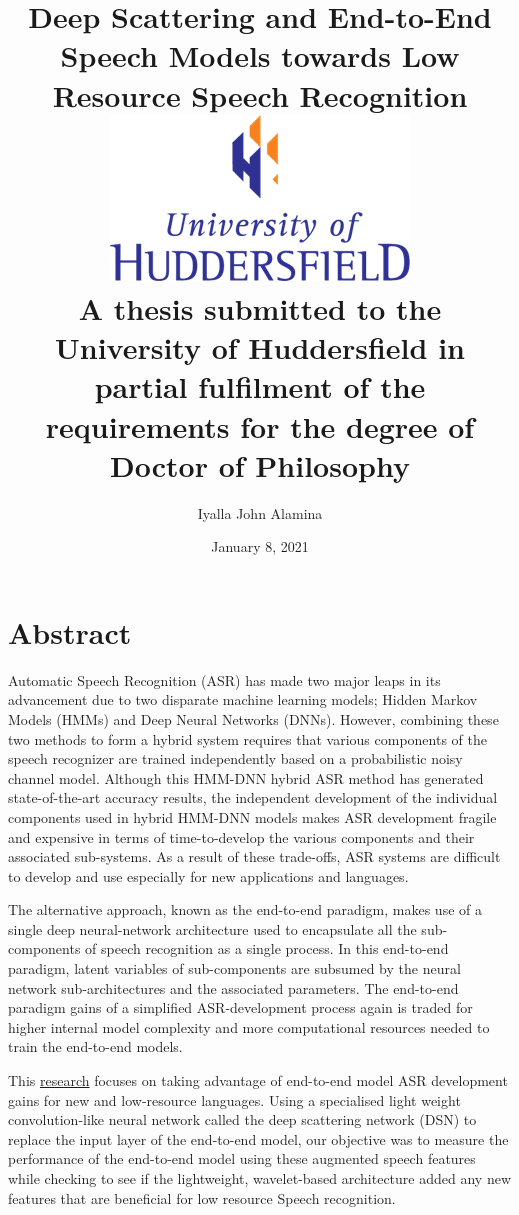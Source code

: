 \documentclass[12pt,twoside]{report}
\title{
    {Deep Scattering and End-to-End Speech Models towards Low Resource Speech Recognition}\\
    {\includegraphics{university.png}\\
A thesis submitted to the University of Huddersfield in partial fulfilment of the requirements for the degree of Doctor of Philosophy}
}
\author{Iyalla John Alamina}
\date{January 8, 2021}
\begin{document}
\makeglossaries


\maketitle
\DeclareRobustCommand{\startblue}{%
  \leavevmode
  \color{blue}
}
\DeclareRobustCommand{\stopblue}{%
  \normalcolor
}


\chapter*{Abstract}
\startblue
Automatic Speech Recognition (ASR) has made two major leaps in its advancement due to two disparate machine learning models; Hidden Markov Models (HMMs) and Deep Neural Networks (DNNs).  However, combining these two methods to form a hybrid system requires that various components of the speech recognizer are trained independently based on a probabilistic noisy channel model.  Although this HMM-DNN hybrid ASR method has generated state-of-the-art accuracy results, the independent development of the individual components used in hybrid HMM-DNN models makes ASR development fragile and expensive in terms of time-to-develop the various components and their associated sub-systems.  As a result of these trade-offs, ASR systems are difficult to develop and use especially for new applications and languages.

The alternative approach, known as the end-to-end paradigm, makes use of a single deep neural-network architecture used to encapsulate all the sub-components of speech recognition as a single process.  In this end-to-end paradigm, latent variables of sub-components are subsumed by the neural network sub-architectures and the associated parameters.  The end-to-end paradigm gains of a simplified ASR-development process again is traded for higher internal model complexity and more computational resources needed to train the end-to-end models. 

This \href{https://docs.google.com/document/d/1ne2ctaxjpOlilMDg88aTtzOdIyP-wI2_ST5mGDvAYMw/edit?usp=sharing}{research} focuses on taking advantage of end-to-end model ASR development gains for new and low-resource languages. Using a specialised light weight convolution-like neural network called the deep scattering network (DSN) to replace the input layer of the end-to-end model, our objective was to measure the performance of the end-to-end model using these augmented speech features while checking to see if the lightweight, wavelet-based architecture added any new features that are beneficial for low resource Speech recognition. 
\end{document}
